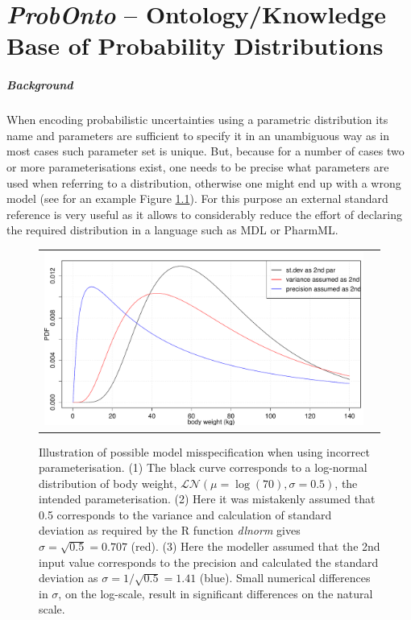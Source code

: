 \chapter{\emph{ProbOnto} -- Ontology/Knowledge Base of Probability Distributions}
\label{ch:ProbOnto}


\paragraph{Background}
When encoding probabilistic uncertainties using a parametric distribution its name and 
parameters are sufficient to specify it in an unambiguous way as 
in most cases such parameter set is unique. But, because for a number of cases 
two or more parameterisations exist, one needs to be precise what 
parameters are used when referring to a distribution, otherwise one might 
end up with a wrong model (see for an example Figure \ref{fig:whatCanGoWrong}).
For this purpose an external standard reference is very useful as it allows to 
considerably reduce the effort of declaring the required distribution in a language 
such as MDL or PharmML.

\begin{figure}[htb!]
\centering
\begin{tabular}{cc}
 \includegraphics[width=140mm]{pics/whatCanGoWrong}
\end{tabular}
\caption{Illustration of possible model misspecification when using incorrect 
parameterisation. (1) The black curve corresponds to a log-normal 
distribution of body weight, $\mathcal {LN}(\mu\!=\!\log(70),\sigma\!=\!0.5)$, the 
intended parameterisation. (2) Here it was mistakenly assumed that 0.5 corresponds 
to the variance and calculation of standard deviation as required by the R function 
\emph{dlnorm} gives $\sigma = \sqrt{0.5}=0.707$ (red). (3) Here the modeller 
assumed that the 2nd input value corresponds to the precision and calculated the 
standard deviation as $\sigma = 1/\sqrt{0.5}=1.41$ (blue). Small numerical 
differences in $\sigma$, on the log-scale, result in significant differences on the natural scale.}
\label{fig:whatCanGoWrong}
\end{figure}

